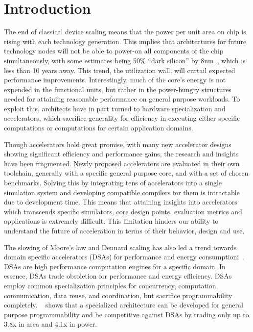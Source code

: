 \section{Introduction}

The end of classical device scaling means that the power per unit area on chip
is rising with each technology generation.  This implies that architectures for
future technology nodes will not be able to power-on all components of the chip
simultaneously, with some estimates being 50\% ``dark silicon'' by
8nm~\cite{isca11:dark-silicon}, which is less than 10 years away.  This trend,
the utilization wall, will curtail expected performance improvements.
Interestingly, much of the core's energy is not expended in the functional
units, but rather in the power-hungry structures needed for
attaining reasonable performance on general purpose workloads.  To exploit this,
architects have in part turned to hardware specialization and
accelerators, which sacrifice generality for efficiency in executing either
specific computations or computations for certain application domains.

Though accelerators hold great promise, with many new accelerator designs
showing significant efficiency and performance gains, the research and 
insights have been fragmented.  Newly proposed accelerators are evaluated 
in their own toolchain, generally with a specific general purpose core, and with 
a set of chosen benchmarks.  Solving this by integrating tens of accelerators 
into a single simulation system and developing compatible compilers 
for them is intractable due to development time.  This means that attaining 
insights into accelerators which transcends specific simulators, core design
points, evaluation metrics and applications is extremely difficult.
This limitation hinders our ability to understand the future of acceleration 
in terms of their behavior, design and use.


The slowing of Moore’s law and Dennard scaling has also led a trend towards 
domain specific accelerators (DSAs) for performance and energy consumptioni~\cite{1815968}. 
DSAs are high performance computation engines for a specific domain. 
In essence, DSAs trade obsoletion for performance and energy efficiency. 
DSAs employ common specialization principles for concurrency, computation, 
communication, data reuse, and coordination, 
but sacrifice programmability completely. 
~\cite{nowatzki2016pushing} shows that a specialized architecture can be developed for 
general purpose programmability and be competitive 
against DSAs by trading only up to 3.8x in area and 4.1x in power. 


